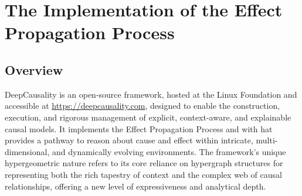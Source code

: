 
\section{The Implementation of the Effect Propagation Process}
\label{sec:implementation}

\subsection{Overview}
\label{sec:implementation_overview}

DeepCausality is an open-source framework, hosted at the Linux Foundation and accessible at \url{https://deepcausality.com}, designed to enable the construction, execution, and rigorous management of explicit, context-aware, and explainable causal models. It implements the Effect Propagation Process and with hat provides a pathway to reason about cause and effect within intricate, multi-dimensional, and dynamically evolving environments. 
The framework's unique hypergeometric nature refers to its core reliance on hypergraph structures for representing both the rich tapestry of context and the complex web of causal relationships,
 offering a new level of expressiveness and analytical depth.

